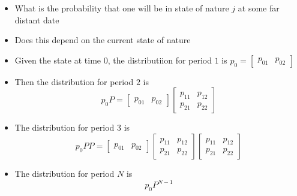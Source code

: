 \documentclass[notes=show]{beamer}
\begin{document}
\begin{frame}%


\begin{itemize}
\item What is the probability that one will be in state of nature $j$ at
some far distant date

\item Does this depend on the current state of nature

\item Given the state at time $0$, the distributiion for period $1$ is $%
p_{0}=\left[ 
\begin{array}{cc}
p_{01} & p_{02}%
\end{array}%
\right] $

\item Then the distribution for period $2$ is 
\[
p_{0}P=\left[ 
\begin{array}{cc}
p_{01} & p_{02}%
\end{array}%
\right] \left[ 
\begin{array}{cc}
p_{11} & p_{12} \\ 
p_{21} & p_{22}%
\end{array}%
\right] 
\]

\item The distribution for period $3$ is 
\[
p_{0}PP=\left[ 
\begin{array}{cc}
p_{01} & p_{02}%
\end{array}%
\right] \left[ 
\begin{array}{cc}
p_{11} & p_{12} \\ 
p_{21} & p_{22}%
\end{array}%
\right] \left[ 
\begin{array}{cc}
p_{11} & p_{12} \\ 
p_{21} & p_{22}%
\end{array}%
\right] 
\]

\item The distribution for period $N$ is%
\[
p_{0}P^{N-1}
\]
\end{itemize}

\end{frame}%
\end{document}
